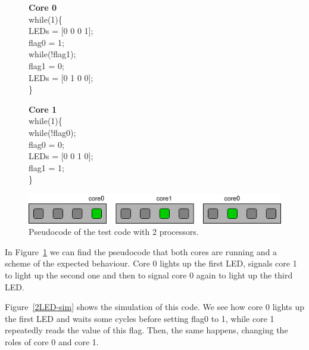 \begin{figure}[htbp]
\centering
\begin{minipage}[t][4cm][t]{4.5cm}
\textbf{Core 0}\\
while(1)\{\\
\hspace*{1cm}LEDs = [0 0 0 1];\\
\hspace*{1cm}flag0 = 1;\\
\hspace*{1cm}while(!flag1);\\
\hspace*{1cm}flag1 = 0;\\
\hspace*{1cm}LEDs = [0 1 0 0];\\
\}
\end{minipage}\hspace{2.5cm}
\begin{minipage}[t][4cm][t]{4.5cm}
\textbf{Core 1}\\
while(1)\{\\
\hspace*{1cm}while(!flag0);\\
\hspace*{1cm}flag0 = 0;\\
\hspace*{1cm}LEDs = [0 0 1 0];\\
\hspace*{1cm}flag1 = 1;\\
\}
\end{minipage}%
\vspace{.1cm}
\includegraphics[width=.75\textwidth]{images/LEDs2_fig.png}
\caption{Pseudocode of the test code with 2 processors.}
\label{2LED-code}
\end{figure}
\clearpage
In Figure~\ref{2LED-code} we can find the pseudocode that both cores are running and a scheme of the expected behaviour.
Core 0 lights up the first LED, signals core 1 to light up the second one and then to signal core 0 again to light up the third LED.

Figure~\ref{2LED-sim} shows the simulation of this code.
We see how core 0 lights up the first LED and waits some cycles before setting flag0 to 1, while core 1 repeatedly reads the value of this flag.
Then, the same happens, changing the roles of core 0 and core 1.

